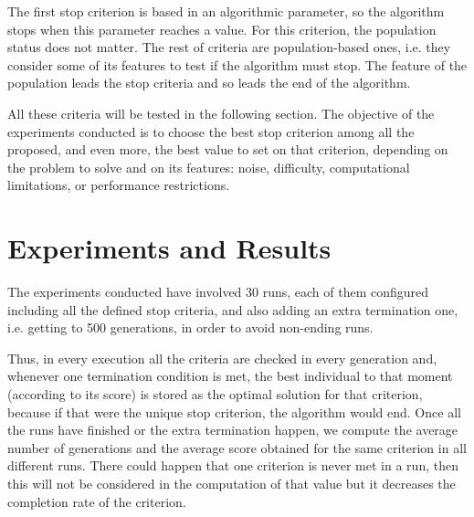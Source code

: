 \documentclass[runningheads,a4paper]{llncs}
\begin{document}
The first stop criterion is based in an algorithmic parameter, so the algorithm stops when this parameter reaches a value. For this criterion, the population status does not matter. The rest of criteria are population-based ones, i.e. they consider some of its features to test if the algorithm must stop. The feature of the population leads the stop criteria and so leads the end of the algorithm. 

All these criteria will be tested in the following section. The objective of the experiments conducted is to choose the best stop criterion among all the proposed, and even more, the best value to set on that criterion, depending on the problem to solve and on its features: noise, difficulty, computational limitations, or performance restrictions.


%
%
\section{Experiments and Results}
\label{sec:res}

The experiments conducted have involved 30 runs, each of them configured including all the defined stop criteria, and also adding an extra termination one, i.e. getting to 500 generations, in order to avoid non-ending runs.


Thus, in every execution all the criteria are checked in every generation and, whenever one termination condition is met, the best individual to that moment (according to its score) is stored as the optimal solution for that criterion, because if that were the unique stop criterion, the algorithm would end.
Once all the runs have finished or the extra termination happen, we compute the average number of generations and the average score obtained for the same criterion in all different runs. There could happen that one criterion is never met in a run, then this will not be considered in the computation of that value but it decreases the completion rate of the criterion. 
\end{document}
